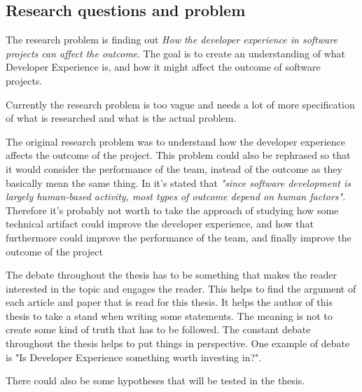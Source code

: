 \documentclass[english, 12pt, a4paper, sci, utf8, a-1b, online]{aaltothesis}
\begin{document}
\subsection{Research questions and problem}

The research problem is finding out \textit{How the developer experience in software projects can affect the outcome}. The goal is to create an understanding of what Developer Experience is, and how it might affect the outcome of software projects.

  {
    \color{gray}
    Currently the research problem is too vague and needs a lot of more specification of what is researched and what is the actual problem.

    The original research problem was to understand how the developer experience affects the outcome of the project. This problem could also be rephrased so that it would consider the performance of the team, instead of the outcome as they basically mean the same thing. In \cite{how-developers-experience-team-performance} it's stated that \textit{"since software development is largely human-based activity, most types of outcome depend on human factors"}. Therefore it's probably not worth to take the approach of studying how some technical artifact could improve the developer experience, and how that furthermore could improve the performance of the team, and finally improve the outcome of the project

    The debate throughout the thesis has to be something that makes the reader interested in the topic and engages the reader. This helps to find the argument of each article and paper that is read for this thesis. It helps the author of this thesis to take a stand when writing some statements. The meaning is not to create some kind of truth that has to be followed. The constant debate throughout the thesis helps to put things in perspective. One example of debate is "Is Developer Experience something worth investing in?".

    There could also be some hypotheses that will be tested in the thesis.
  }

\newcommand{\rqone}{What is the difference in the definition of Developer Experience in academic and industry literature?}
\newcommand{\rqtwo}{What aspects of Developer Experience are currently being considered in software projects? What aspects of Developer Experience do developers see as valuable?}
\newcommand{\rqthree}{Can the results of software projects be improved by investing in a better developer experience?}
\end{document}
